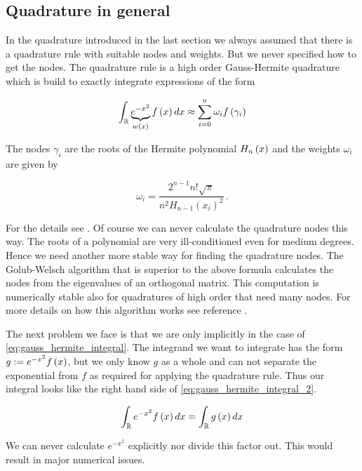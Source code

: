 \subsection{Quadrature in general}

In the quadrature introduced in the last section we always assumed that there is a
quadrature rule with suitable nodes and weights. But we never specified how to
get the nodes. The quadrature rule is a high order Gauss-Hermite quadrature
which is build to exactly integrate expressions of the form

\begin{equation} \label{eq:gauss_hermite_integral}
  \int_\mathbb{R} \underbrace{e^{-x^2}}_{w\left( x \right)} f\left( x \right) dx \approx \sum_{i=0}^{n} \omega_i f\left( \gamma_i \right)
\end{equation}

The nodes $\gamma_i$ are the roots of the Hermite polynomial $H_{n}\left( x \right)$ and
the weights $\omega_i$ are given by

\begin{equation}
  \omega_i = \frac {2^{n-1} n! \sqrt{\pi}} {n^2 H_{n-1}(x_i)^2} \,.
\end{equation}

For the details see \cite{AandS}. Of course we can never calculate the quadrature
nodes this way. The roots of a polynomial are very ill-conditioned even for
medium degrees. Hence we need another more stable way for finding the quadrature
nodes. The Golub-Welsch algorithm that is superior to the above formula calculates
the nodes from the eigenvalues of an orthogonal matrix. This computation is
numerically stable also for quadratures of high order that need many nodes.
For more details on how this algorithm works see reference \cite{Golub_Welsch_algorithm}.

The next problem we face is that we are only implicitly in the case of \eqref{eq:gauss_hermite_integral}.
The integrand we want to integrate has the form $g := e^{-x^2} f\left( x \right)$, but
we only know $g$ as a whole and can not separate the exponential from $f$ as required
for applying the quadrature rule. Thus our integral looks like the right hand side of \eqref{eq:gauss_hermite_integral_2}.

\begin{equation} \label{eq:gauss_hermite_integral_2}
  \int_\mathbb{R} e^{-x^2} f\left( x \right) dx = \int_\mathbb{R} g\left( x \right) dx
\end{equation}

We can never calculate $e^{-x^2}$ explicitly nor divide this factor out. This would
result in major numerical issues.

